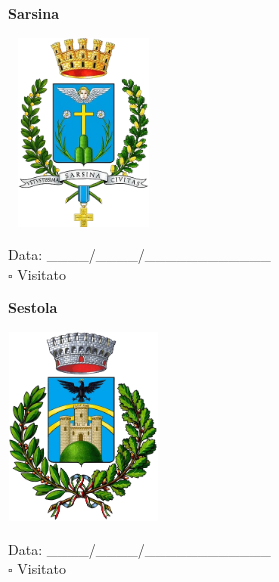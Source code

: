 \documentclass[a5paper,12pt]{article}
\begin{document}
\newpage

\noindent
\begin{minipage}[t]{0.45\textwidth}
    \begin{center}
        \textbf{Sarsina}
    \end{center}
    \vspace{-0.5cm} %
    \begin{center}
        \includegraphics[height= 5cm, width=4cm]{Emilia Romagna/Stemma Sarsina.png}
    \end{center}
    \vspace{-0.4cm} %
    \begin{flushleft}
        Data: \_\_\_\_/\_\_\_\_/\_\_\_\_\_\_\_\_\_\_\_\_ \\
        $\square$ Visitato
    \end{flushleft}
\end{minipage}
\hfill
\noindent
\begin{minipage}[t]{0.45\textwidth}
    \begin{center}
        \textbf{Sestola}
    \end{center}
    \vspace{-0.5cm} %
    \begin{center}
        \includegraphics[height= 5cm, width=4cm]{Emilia Romagna/Stemma Sestola.png}
    \end{center}
    \vspace{-0.4cm} %
    \begin{flushleft}
        Data: \_\_\_\_/\_\_\_\_/\_\_\_\_\_\_\_\_\_\_\_\_ \\
        $\square$ Visitato
    \end{flushleft}
\end{minipage}
\end{document}
